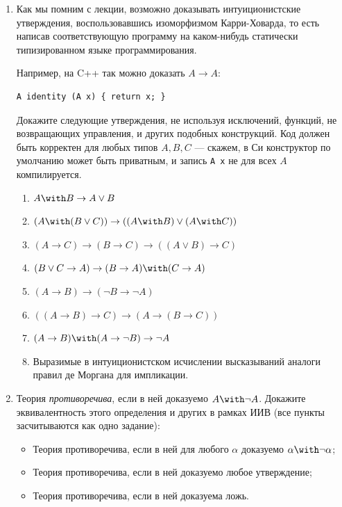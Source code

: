 \documentclass[10pt,a4paper,oneside]{article}
\begin{document}
\begin{enumerate}
\item Как мы помним с лекции, возможно доказывать интуиционистские утверждения, воспользовавшись изоморфизмом Карри-Ховарда, 
то есть написав соответствующую программу на каком-нибудь статически типизированном языке программирования. 

Например, на C++ так можно доказать $A\rightarrow A$:
\begin{verbatim}
A identity (A x) { return x; }
\end{verbatim}

Докажите следующие утверждения, не используя исключений, функций, не возвращающих управления, и других подобных конструкций.
Код должен быть корректен для любых типов $A, B, C$ --- скажем, в Си конструктор по умолчанию может быть приватным, и 
запись \verb!A x! не для всех $A$ компилируется.
\begin{enumerate}
\item $A \with B \rightarrow A \vee B$
\item $(A \with (B \vee C)) \rightarrow ((A \with B) \vee (A \with C))$
\item $(A \rightarrow C) \rightarrow (B \rightarrow C) \rightarrow ((A \vee B) \rightarrow C)$
\item $(B \vee C \rightarrow A) \rightarrow (B \rightarrow A) \with (C \rightarrow A)$
\item $(A \rightarrow B) \rightarrow (\neg B \rightarrow \neg A)$
\item $((A \rightarrow B) \rightarrow C) \rightarrow (A \rightarrow (B \rightarrow C))$
\item $(A \rightarrow B) \with (A \rightarrow \neg B) \rightarrow \neg A$
\item Выразимые в интуиционистском исчислении высказываний аналоги правил де Моргана для импликации.
\end{enumerate}

\item Теория \emph{противоречива}, если в ней доказуемо $A \with \neg A$. Докажите эквивалентность этого определения и других
в рамках ИИВ (все пункты засчитываются как одно задание):
\begin{itemize}
\item Теория противоречива, если в ней для любого $\alpha$ доказуемо $\alpha \with \neg\alpha$;
\item Теория противоречива, если в ней доказуемо любое утверждение;
\item Теория противоречива, если в ней доказуема ложь.
\end{itemize}


\end{enumerate}
\end{document}
